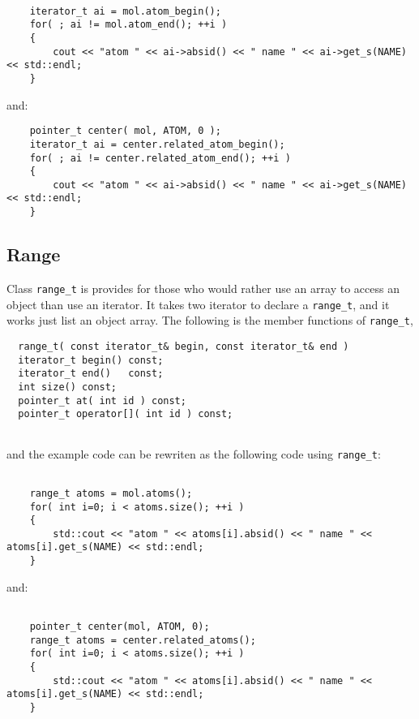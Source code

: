 \documentclass[letterpaper]{book}
\begin{document}
\begin{lstlisting}

    iterator_t ai = mol.atom_begin();
    for( ; ai != mol.atom_end(); ++i )
    {
        cout << "atom " << ai->absid() << " name " << ai->get_s(NAME) << std::endl;
    }

\end{lstlisting}

and:

\begin{lstlisting}
    pointer_t center( mol, ATOM, 0 );
    iterator_t ai = center.related_atom_begin();
    for( ; ai != center.related_atom_end(); ++i )
    {
        cout << "atom " << ai->absid() << " name " << ai->get_s(NAME) << std::endl;
    }
\end{lstlisting}

\subsection{Range}

Class \lstinline$range_t$ is provides for those who would rather use an array to access
an object than use an iterator. It takes two iterator to declare a \lstinline$range_t$, and
it works just list an object array. The following is the member functions of \lstinline$range_t$,

\begin{lstlisting}
  range_t( const iterator_t& begin, const iterator_t& end )       
  iterator_t begin() const;
  iterator_t end()   const;        
  int size() const;        
  pointer_t at( int id ) const;
  pointer_t operator[]( int id ) const;
 
\end{lstlisting}

and the example code can be rewriten as the following code using \lstinline$range_t$:

\begin{lstlisting}

    range_t atoms = mol.atoms();
    for( int i=0; i < atoms.size(); ++i )
    {
        std::cout << "atom " << atoms[i].absid() << " name " << atoms[i].get_s(NAME) << std::endl;
    }

\end{lstlisting}

and:

\begin{lstlisting}

    pointer_t center(mol, ATOM, 0);
    range_t atoms = center.related_atoms();
    for( int i=0; i < atoms.size(); ++i )
    {
        std::cout << "atom " << atoms[i].absid() << " name " << atoms[i].get_s(NAME) << std::endl;
    }

\end{lstlisting}
\end{document}
